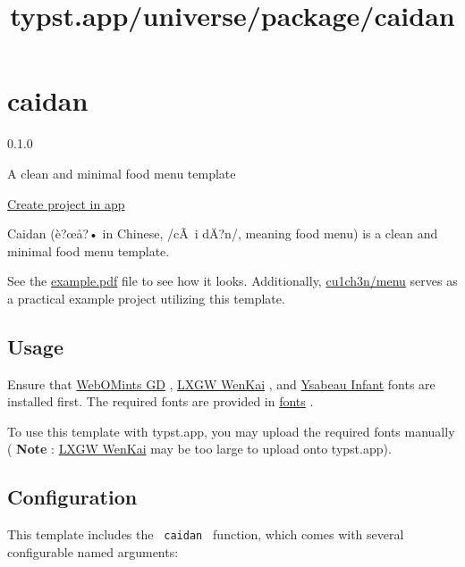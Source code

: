 \title{typst.app/universe/package/caidan}

\label{banner}
\label{template-thumbnail}

\section{caidan}\label{caidan}

{ 0.1.0 }

A clean and minimal food menu template

\href{/app?template=caidan&version=0.1.0}{Create project in app}

\label{readme}
Caidan (è?œå?• in Chinese, /cÃ~i dÄ?n/, meaning food menu) is a clean
and minimal food menu template.

See the
\href{https://github.com/cu1ch3n/caidan/blob/main/example.pdf}{example.pdf}
file to see how it looks. Additionally,
\href{https://github.com/cu1ch3n/menu}{cu1ch3n/menu} serves as a
practical example project utilizing this template.

\subsection{Usage}\label{usage}

Ensure that
\href{http://www.galapagosdesign.com/original/webomints.htm}{WebOMints
GD} , \href{https://github.com/lxgw/LxgwWenKai}{LXGW WenKai} , and
\href{https://fonts.google.com/specimen/Ysabeau+Infant}{Ysabeau Infant}
fonts are installed first. The required fonts are provided in
\href{https://github.com/cu1ch3n/caidan/tree/main/fonts}{fonts} .

To use this template with typst.app, you may upload the required fonts
manually ( \textbf{Note} :
\href{https://github.com/lxgw/LxgwWenKai}{LXGW WenKai} may be too large
to upload onto typst.app).

\subsection{Configuration}\label{configuration}

This template includes the \texttt{\ caidan\ } function, which comes
with several configurable named arguments:

